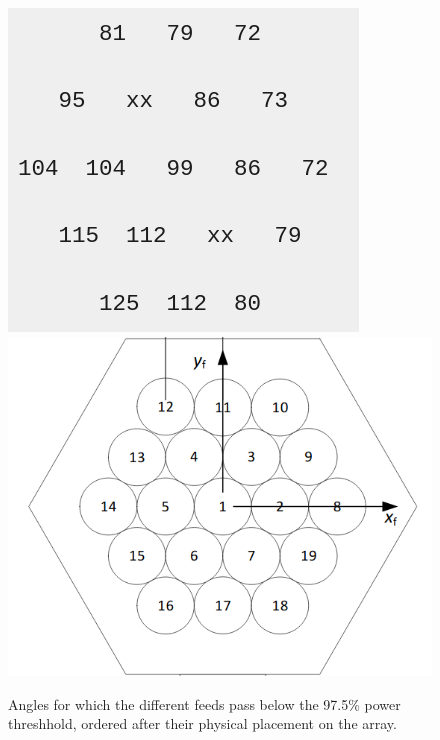 \documentclass[10pt, a4paper]{article}
\begin{document}
\begin{figure}[h!]
    \centering
    \includegraphics[scale=0.54]{../vane_nums1.png}
    \includegraphics[scale=0.44]{../vane_nums2.png}
    \caption{Angles for which the different feeds pass below the 97.5\% power threshhold, ordered after their physical placement on the array.}
    \label{}
\end{figure}
\end{document}
